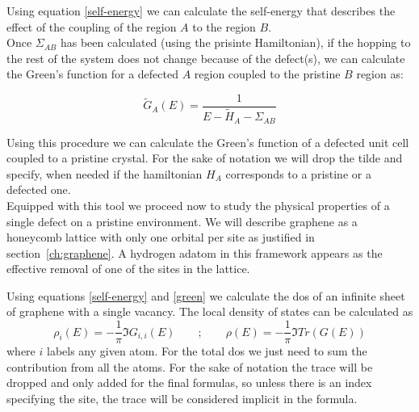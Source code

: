 Using equation \eqref{self-energy} we can calculate the self-energy that describes the effect of the coupling of the region $A$ to the region $B$.\\

Once $\Sigma_{AB}$ has been calculated (using the prisinte Hamiltonian), if the hopping to the rest of the system does not change because of the defect(s), we can calculate the Green's function for a defected $A$ region coupled to the pristine $B$ region as:

\begin{equation}
\widetilde{G}_A(E) = \frac{1}{E-\widetilde{H}_{A}-\Sigma_{AB}}
\label{green}
\end{equation}

Using this procedure we can calculate the Green's function of a defected unit cell coupled to a pristine crystal.
For the sake of notation we will drop the tilde and specify, when needed if the hamiltonian $H_A$ corresponds to a pristine or a defected one.\\


Equipped with this tool we proceed now to study the physical properties of a single defect on a pristine environment. We will describe graphene as a honeycomb lattice with only one orbital per site as justified in section~\ref{ch:graphene}. A hydrogen adatom in this framework appears as the effective removal of one of the sites in the lattice.

Using equations \eqref{self-energy} and \eqref{green} we calculate the \ac{dos} of an infinite sheet of graphene with a single vacancy. The local density of states can be calculated as
\begin{equation}
\rho_{i}(E) = -\frac{1}{\pi}\Im{G_{i,i}(E)} \quad\quad;\quad\quad
\rho(E) = -\frac{1}{\pi}\Im{Tr\left(G(E)\right)}
\label{eq:DOS}
\end{equation}
where $i$ labels any given atom. For the total \ac{dos} we just need to sum the contribution from all the atoms. For the sake of notation the trace will be dropped and only added for the final formulas, so unless there is an index specifying the site, the trace will be considered implicit in the formula.


